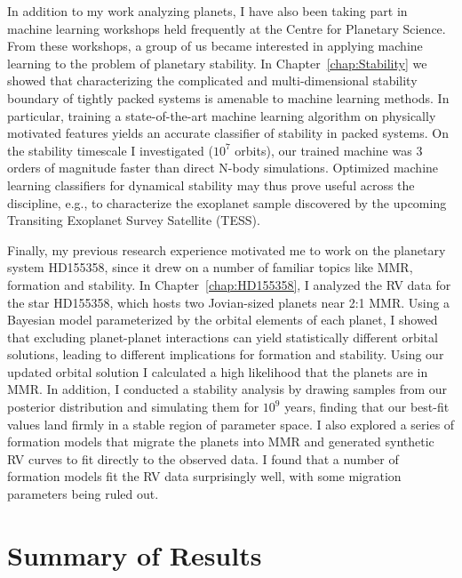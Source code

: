 In addition to my work analyzing \kep planets, I have also been taking part in machine learning workshops held frequently at the Centre for Planetary Science. 
From these workshops, a group of us became interested in applying machine learning to the problem of planetary stability. 
In Chapter~\ref{chap:Stability} we showed that characterizing the complicated and multi-dimensional stability boundary of tightly packed systems is amenable to machine learning methods. 
In particular, training a state-of-the-art machine learning algorithm on physically motivated features yields an accurate classifier of stability in packed systems. 
On the stability timescale I investigated ($10^7$ orbits), our trained machine was 3 orders of magnitude faster than direct N-body simulations. 
Optimized machine learning classifiers for dynamical stability may thus prove useful across the discipline, e.g., to characterize the exoplanet sample discovered by the upcoming Transiting Exoplanet Survey Satellite (TESS).

Finally, my previous research experience motivated me to work on the planetary system HD155358, since it drew on a number of familiar topics like MMR, formation and stability. 
In Chapter~\ref{chap:HD155358}, I analyzed the RV data for the star HD155358, which hosts two Jovian-sized planets near 2:1 MMR. 
Using a Bayesian model parameterized by the orbital elements of each planet, I showed that excluding planet-planet interactions can yield statistically different orbital solutions, leading to different implications for formation and stability. 
Using our updated orbital solution I calculated a high likelihood that the planets are in MMR. 
In addition, I conducted a stability analysis by drawing samples from our posterior distribution and simulating them for $10^9$ years, finding that our best-fit values land firmly in a stable region of parameter space.
I also explored a series of formation models that migrate the planets into MMR and generated synthetic RV curves to fit directly to the observed data. 
I found that a number of formation models fit the RV data surprisingly well, with some migration parameters being ruled out.

\section{Summary of Results}
